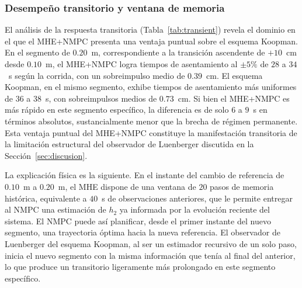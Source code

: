 \documentclass[12pt,letterpaper]{article}
\begin{document}
\subsubsection{Desempeño transitorio y ventana de memoria}
\label{sec:analisis_exp_trans}

El análisis de la respuesta transitoria (Tabla~\ref{tab:transient}) 
revela el dominio en el que el MHE+NMPC presenta una ventaja 
puntual sobre el esquema Koopman. En el segmento de $0.20$~m, 
correspondiente a la transición ascendente de $+10$~cm desde 
$0.10$~m, el MHE+NMPC logra tiempos de asentamiento al $\pm 5\%$ 
de $28$ a $34$~s según la corrida, con un sobreimpulso medio de 
$0.39$~cm. El esquema Koopman, en el mismo segmento, exhibe 
tiempos de asentamiento más uniformes de $36$ a $38$~s, con 
sobreimpulsos medios de $0.73$~cm. Si bien el MHE+NMPC es más 
rápido en este segmento específico, la diferencia es de solo 
$6$ a $9$~s en términos absolutos, sustancialmente menor que la 
brecha de régimen permanente. Esta ventaja puntual del MHE+NMPC 
constituye la manifestación transitoria de la limitación 
estructural del observador de Luenberger discutida en la 
Sección~\ref{sec:discusion}.

La explicación física es la siguiente. En el instante del cambio de 
referencia de $0.10$~m a $0.20$~m, el MHE dispone de una ventana 
de $20$ pasos de memoria histórica, equivalente a $40$~s de
observaciones anteriores, que le permite entregar al NMPC una
estimación de $h_2$ ya informada por la evolución reciente del 
sistema. El NMPC puede así planificar, desde el primer instante del 
nuevo segmento, una trayectoria óptima hacia la nueva referencia. 
El observador de Luenberger del esquema Koopman, al ser un estimador 
recursivo de un solo paso, inicia el nuevo segmento con la misma 
información que tenía al final del anterior, lo que produce un 
transitorio ligeramente más prolongado en este segmento específico.
\end{document}
